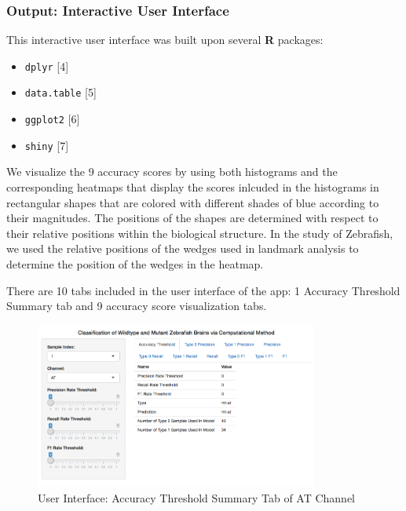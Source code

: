 \documentclass[10pt,letterpaper]{article}
\providecommand{\tightlist}{%
  \setlength{\itemsep}{0pt}\setlength{\parskip}{0pt}}
\begin{document}
\subsubsection{Output: Interactive User
Interface}\label{output-interactive-user-interface}

This interactive user interface was built upon several \textbf{R}
packages:

\begin{itemize}
\tightlist
\item
  \texttt{dplyr} {[}4{]}
\item
  \texttt{data.table} {[}5{]}
\item
  \texttt{ggplot2} {[}6{]}
\item
  \texttt{shiny} {[}7{]}
\end{itemize}

We visualize the 9 accuracy scores by using both histograms and the
corresponding heatmaps that display the scores inlcuded in the
histograms in rectangular shapes that are colored with different shades
of blue according to their magnitudes. The positions of the shapes are
determined with respect to their relative positions within the
biological structure. In the study of Zebrafish, we used the relative
positions of the wedges used in landmark analysis to determine the
position of the wedges in the heatmap.

There are 10 tabs included in the user interface of the app: 1 Accuracy
Threshold Summary tab and 9 accuracy score visualization tabs.

\begin{figure}[h]

{\centering \includegraphics[width=3.66in]{figures/shiny1} 

}

\caption{User Interface: Accuracy Threshold Summary Tab of AT Channel}\label{fig:shiny1}
\end{figure}
\end{document}
